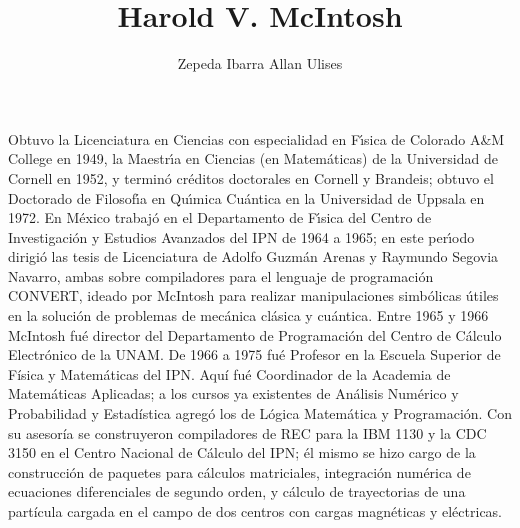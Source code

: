 \documentclass[a4paper,10pt]{article}
\title{Harold V. McIntosh}
\author{Zepeda Ibarra Allan Ulises}
\begin{document}
\maketitle

Obtuvo la Licenciatura en Ciencias con especialidad en F\'{\i}sica de Colorado A\&M College en 1949, la Maestr\'{\i}a en Ciencias 
(en Matem\'aticas) de la Universidad de Cornell en 1952, y termin\'o cr\'editos doctorales en Cornell y Brandeis; obtuvo el Doctorado 
de Filosof\'{\i}a en Qu\'{\i}mica Cu\'antica en la Universidad de Uppsala en 1972.
En M\'exico trabaj\'o en el Departamento de F\'{\i}sica del Centro de Investigaci\'on y Estudios Avanzados del IPN de 1964 a 1965; 
en este per\'{\i}odo dirigió las tesis de Licenciatura de Adolfo Guzm\'an Arenas y Raymundo Segovia Navarro, ambas sobre compiladores para el 
lenguaje de programaci\'on CONVERT, ideado por McIntosh para realizar manipulaciones simb\'olicas \'utiles en la soluci\'on de problemas de 
mec\'anica cl\'asica y cu\'antica.
Entre 1965 y 1966 McIntosh fué director del Departamento de Programación del Centro de Cálculo Electrónico de la UNAM.
De 1966 a 1975 fué Profesor en la Escuela Superior de Física y Matemáticas del IPN. Aquí fué Coordinador de la Academia de Matemáticas 
Aplicadas; a los cursos ya existentes de Análisis Numérico y Probabilidad y Estadística agregó los de Lógica Matemática y Programación.
Con su asesoría se construyeron compiladores de REC para la IBM 1130 y la CDC 3150 en el Centro Nacional de Cálculo del IPN; él mismo se 
hizo cargo de la construcción de paquetes para cálculos matriciales, integración numérica de ecuaciones diferenciales de segundo orden, 
y cálculo de trayectorias de una partícula cargada en el campo de dos centros con cargas magnéticas y eléctricas.
\end{document}
